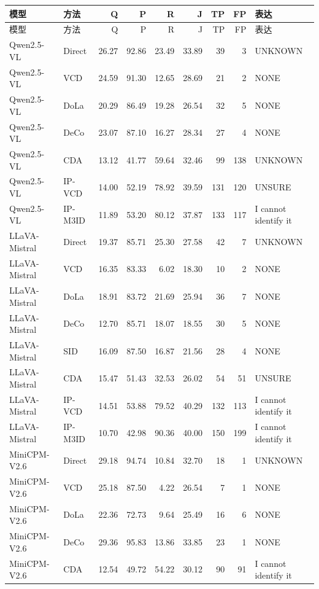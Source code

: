 \begin{longtable}{llrrrrrrl}
\toprule
模型 & 方法 & Q & P & R & J & TP & FP & 表达\\
\midrule\endfirsthead
\toprule
模型 & 方法 & Q & P & R & J & TP & FP & 表达\\
\midrule\endhead
\bottomrule\endfoot
Qwen2.5-VL & Direct & 26.27 & 92.86 & 23.49 & 33.89 & 39 & 3 & UNKNOWN\\
Qwen2.5-VL & VCD & 24.59 & 91.30 & 12.65 & 28.69 & 21 & 2 & NONE\\
Qwen2.5-VL & DoLa & 20.29 & 86.49 & 19.28 & 26.54 & 32 & 5 & NONE\\
Qwen2.5-VL & DeCo & 23.07 & 87.10 & 16.27 & 28.34 & 27 & 4 & NONE\\
Qwen2.5-VL & CDA & 13.12 & 41.77 & 59.64 & 32.46 & 99 & 138 & UNKNOWN\\
Qwen2.5-VL & IP-VCD & 14.00 & 52.19 & 78.92 & 39.59 & 131 & 120 & UNSURE\\
Qwen2.5-VL & IP-M3ID & 11.89 & 53.20 & 80.12 & 37.87 & 133 & 117 & I cannot identify it\\
LLaVA-Mistral & Direct & 19.37 & 85.71 & 25.30 & 27.58 & 42 & 7 & UNKNOWN\\
LLaVA-Mistral & VCD & 16.35 & 83.33 & 6.02 & 18.30 & 10 & 2 & NONE\\
LLaVA-Mistral & DoLa & 18.91 & 83.72 & 21.69 & 25.94 & 36 & 7 & NONE\\
LLaVA-Mistral & DeCo & 12.70 & 85.71 & 18.07 & 18.55 & 30 & 5 & NONE\\
LLaVA-Mistral & SID & 16.09 & 87.50 & 16.87 & 21.56 & 28 & 4 & NONE\\
LLaVA-Mistral & CDA & 15.47 & 51.43 & 32.53 & 26.02 & 54 & 51 & UNSURE\\
LLaVA-Mistral & IP-VCD & 14.51 & 53.88 & 79.52 & 40.29 & 132 & 113 & I cannot identify it\\
LLaVA-Mistral & IP-M3ID & 10.70 & 42.98 & 90.36 & 40.00 & 150 & 199 & I cannot identify it\\
MiniCPM-V2.6 & Direct & 29.18 & 94.74 & 10.84 & 32.70 & 18 & 1 & UNKNOWN\\
MiniCPM-V2.6 & VCD & 25.18 & 87.50 & 4.22 & 26.54 & 7 & 1 & NONE\\
MiniCPM-V2.6 & DoLa & 22.36 & 72.73 & 9.64 & 25.49 & 16 & 6 & NONE\\
MiniCPM-V2.6 & DeCo & 29.36 & 95.83 & 13.86 & 33.85 & 23 & 1 & NONE\\
MiniCPM-V2.6 & CDA & 12.54 & 49.72 & 54.22 & 30.12 & 90 & 91 & I cannot identify it\\

\end{longtable}
